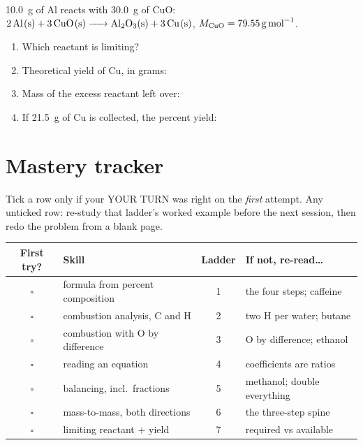 \documentclass{apchem-worksheet}
\begin{document}
\begin{yourturn}
\SI{10.0}{\gram} of Al reacts with \SI{30.0}{\gram} of CuO:
$\ce{2Al(s) + 3CuO(s) -> Al2O3(s) + 3Cu(s)}$,
$M_{\ce{CuO}} = \SI{79.55}{\gram\per\mole}$.
\begin{enumerate}[leftmargin=*,itemsep=0.35em]
  \item Which reactant is limiting? \workspace[2.6cm]
  \item Theoretical yield of Cu, in grams: \workspace[2.2cm]
  \item Mass of the excess reactant left over: \workspace[2.4cm]
  \item If \SI{21.5}{\gram} of Cu is collected, the percent yield:
        \workspace[1.8cm]
\end{enumerate}
\end{yourturn}

\section*{\sffamily Mastery tracker}

Tick a row only if your YOUR TURN was right on the \emph{first} attempt.
Any unticked row: re-study that ladder's worked example before the next
session, then redo the problem from a blank page.

\renewcommand{\arraystretch}{1.35}
\noindent\begin{tabular}{@{}c p{6.6cm} c p{4.4cm}@{}}
\toprule
\textbf{First try?} & \textbf{Skill} & \textbf{Ladder} &
  \textbf{If not, re-read\ldots}\\
\midrule
$\square$ & formula from percent composition & 1 & the four steps; caffeine \\
$\square$ & combustion analysis, C and H & 2 & two H per water; butane \\
$\square$ & combustion with O by difference & 3 & O by difference; ethanol \\
$\square$ & reading an equation & 4 & coefficients are ratios \\
$\square$ & balancing, incl.\ fractions & 5 & methanol; double everything \\
$\square$ & mass-to-mass, both directions & 6 & the three-step spine \\
$\square$ & limiting reactant + yield & 7 & required vs available \\
\bottomrule
\end{tabular}
\end{document}
